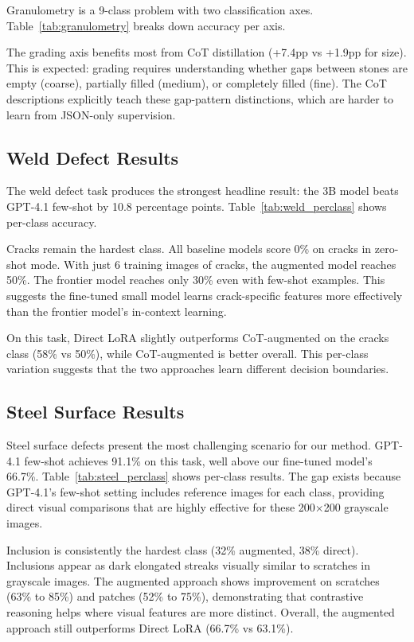 \documentclass{bmvc2k}
\begin{document}
Granulometry is a 9-class problem with two classification axes. Table~\ref{tab:granulometry} breaks down accuracy per axis.

The grading axis benefits most from CoT distillation (+7.4pp vs +1.9pp for size). This is expected: grading requires understanding whether gaps between stones are empty (coarse), partially filled (medium), or completely filled (fine). The CoT descriptions explicitly teach these gap-pattern distinctions, which are harder to learn from JSON-only supervision.

\subsection{Weld Defect Results}

The weld defect task produces the strongest headline result: the 3B model beats GPT-4.1 few-shot by 10.8 percentage points. Table~\ref{tab:weld_perclass} shows per-class accuracy.

Cracks remain the hardest class. All baseline models score 0\% on cracks in zero-shot mode. With just 6 training images of cracks, the augmented model reaches 50\%. The frontier model reaches only 30\% even with few-shot examples. This suggests the fine-tuned small model learns crack-specific features more effectively than the frontier model's in-context learning.

On this task, Direct LoRA slightly outperforms CoT-augmented on the cracks class (58\% vs 50\%), while CoT-augmented is better overall. This per-class variation suggests that the two approaches learn different decision boundaries.

\subsection{Steel Surface Results}

Steel surface defects present the most challenging scenario for our method. GPT-4.1 few-shot achieves 91.1\% on this task, well above our fine-tuned model's 66.7\%. Table~\ref{tab:steel_perclass} shows per-class results. The gap exists because GPT-4.1's few-shot setting includes reference images for each class, providing direct visual comparisons that are highly effective for these 200$\times$200 grayscale images.

Inclusion is consistently the hardest class (32\% augmented, 38\% direct). Inclusions appear as dark elongated streaks visually similar to scratches in grayscale images. The augmented approach shows improvement on scratches (63\% to 85\%) and patches (52\% to 75\%), demonstrating that contrastive reasoning helps where visual features are more distinct. Overall, the augmented approach still outperforms Direct LoRA (66.7\% vs 63.1\%).
\end{document}
